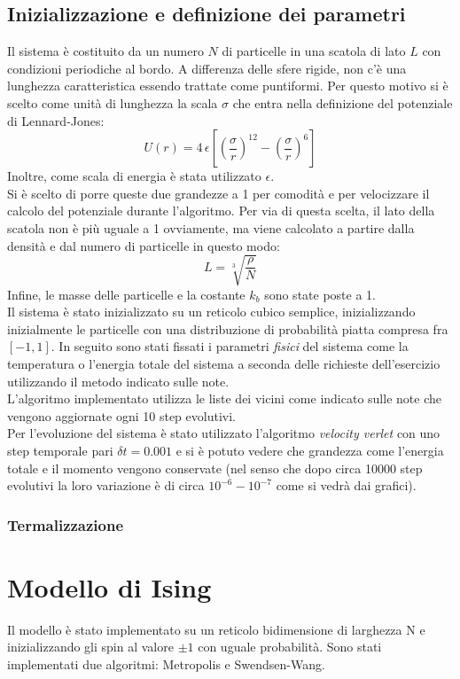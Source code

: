 \section{Inizializzazione e definizione dei parametri}
Il sistema è costituito da un numero $N$ di particelle in una scatola di lato $L$ con condizioni periodiche al bordo. A differenza delle sfere rigide, non c'è una lunghezza caratteristica essendo trattate come puntiformi. Per questo motivo si è scelto come unità di lunghezza la scala $\sigma$ che entra nella definizione del potenziale di Lennard-Jones:
$$
	U(r) = 4 \, \epsilon \left[ \left(\frac{\sigma}{r}\right)^{12} - \left(\frac{\sigma}{r}\right)^6 \right]
$$
Inoltre, come scala di energia è stata utilizzato $\epsilon$.\\
Si è scelto di porre queste due grandezze a 1 per comodità e per velocizzare il calcolo del potenziale durante l'algoritmo. Per via di questa scelta, il lato della scatola non è più uguale a 1 ovviamente, ma viene calcolato a partire dalla densità e dal numero di particelle in questo modo:
$$
	L = \sqrt[3]{\frac{\rho}{N}}
$$
Infine, le masse delle particelle e la costante $k_b$ sono state poste a 1.\\
Il sistema è stato inizializzato su un reticolo cubico semplice, inizializzando inizialmente le particelle con una distribuzione di probabilità piatta compresa fra $[-1,1]$.
In seguito sono stati fissati i parametri \emph{fisici} del sistema come la temperatura o l'energia totale del sistema a seconda delle richieste dell'esercizio utilizzando il metodo indicato sulle note.\\
L'algoritmo implementato utilizza le liste dei vicini come indicato sulle note che vengono aggiornate ogni 10 step evolutivi.\\
Per l'evoluzione del sistema è stato utilizzato l'algoritmo \emph{velocity verlet} con uno step temporale pari $\delta t = 0.001$ e si è potuto vedere che grandezza come l'energia totale e il momento vengono conservate (nel senso che dopo circa 10000 step evolutivi la loro variazione è di circa $10^{-6} - 10^{-7}$ come si vedrà dai grafici).

\subsection{Termalizzazione}





\chapter{Modello di Ising}
Il modello è stato implementato su un reticolo bidimensione di larghezza N e inizializzando gli spin al valore $\pm 1 $  con uguale probabilità.
Sono stati implementati due algoritmi: Metropolis e Swendsen-Wang.\\

